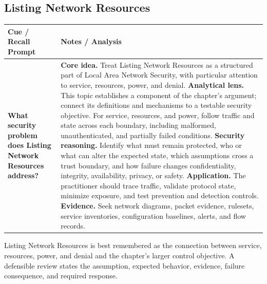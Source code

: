 \documentclass[11pt]{article}
\newcommand{\CornellHeader}{%
\rowcolor{Navy}\color{white}\bfseries Cue / Recall Prompt & \color{white}\bfseries Notes / Analysis\\\hline}
\newcommand{\CornellRow}[2]{%
\cellcolor{CueGray}\RaggedRight\textbf{#1} & \RaggedRight #2\\\hline}
\begin{document}
\subsection*{Listing Network Resources}
\begin{longtable}{>{\RaggedRight\arraybackslash}p{}|>{\RaggedRight\arraybackslash}p{}}
\CornellHeader
\CornellRow{What security problem does Listing Network Resources address?}{\textbf{Core idea.} Treat Listing Network Resources as a structured part of Local Area Network Security, with particular attention to service, resources, power, and denial. \textbf{Analytical lens.} This topic establishes a component of the chapter's argument; connect its definitions and mechanisms to a testable security objective. For service, resources, and power, follow traffic and state across each boundary, including malformed, unauthenticated, and partially failed conditions. \textbf{Security reasoning.} Identify what must remain protected, who or what can alter the expected state, which assumptions cross a trust boundary, and how failure changes confidentiality, integrity, availability, privacy, or safety. \textbf{Application.} The practitioner should trace traffic, validate protocol state, minimize exposure, and test prevention and detection controls. \textbf{Evidence.} Seek network diagrams, packet evidence, rulesets, service inventories, configuration baselines, alerts, and flow records.}
\end{longtable}
\begin{topicsummary}
Listing Network Resources is best remembered as the connection between service, resources, power, and denial and the chapter's larger control objective. A defensible review states the assumption, expected behavior, evidence, failure consequence, and required response.
\end{topicsummary}
\end{document}
